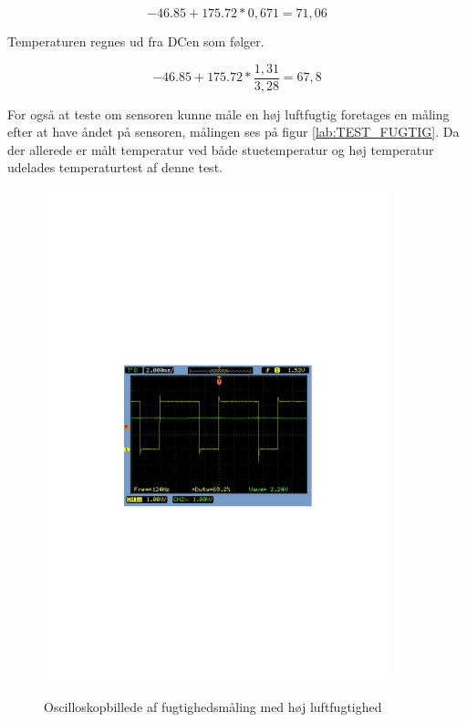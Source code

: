 \begin{equation}
-46.85+175.72*0,671=71,06
\end{equation}

Temperaturen regnes ud fra DCen som følger. 

\begin{equation}
-46.85+175.72*\frac{1,31}{3,28}=67,8
\end{equation}

For også at teste om sensoren kunne måle en høj luftfugtig foretages en måling efter at have åndet på sensoren, målingen ses på figur \ref{lab:TEST_FUGTIG}. Da der allerede er målt temperatur ved både stuetemperatur og høj temperatur udelades temperaturtest af denne test. 

\begin{figure}[H]
\centering
{\includegraphics[width=0.90\textwidth]{filer/modultest/Billeder/SCOP_humidFUGTIG}}
\caption{Oscilloskopbillede af fugtighedsmåling med høj luftfugtighed}
\label{lab:SCOP_FUGT_FUGTIG}
\end{figure}

